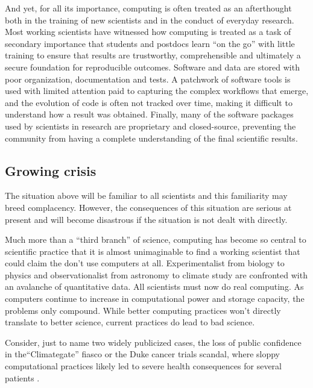 \documentclass[ChapterTOCs,krantz2]{krantz} %
\begin{document}
And yet, for all its importance, computing is often treated as an
afterthought both in the training of new scientists and in the conduct
of everyday research. Most working scientists have witnessed how computing
is treated as a task of secondary importance that students and postdocs
learn ``on the go'' with little training to ensure that results
are trustworthy, comprehensible and ultimately a secure foundation
for reproducible outcomes. Software and data are stored with poor
organization, documentation and tests. A patchwork of software tools
is used with limited attention paid to capturing the complex workflows
that emerge, and the evolution of code is often not tracked over time,
making it difficult to understand how a result was obtained. Finally,
many of the software packages used by scientists in research are proprietary
and closed-source, preventing the community from having a complete
understanding of the final scientific results.

\subsection{Growing crisis}

The situation above will be familiar to all scientists and this familiarity
may breed complacency. However, the consequences of this situation are serious
at present and will become disastrous if the situation is not dealt with
directly. 

Much more than a ``third branch'' of science, computing has become so central
to scientific practice that it is almost unimaginable to find a working
scientist that could claim the don't use computers at all.  Experimentalist
from biology to physics and observationalist from astronomy to climate study
are confronted with an avalanche of quantitative data.  All scientists must now
do real computing.  As computers continue to increase in computational power and
storage capacity, the problems only compound.  While better computing practices
won't directly translate to better science, current practices do lead to bad
science.

Consider, just to name two widely publicized cases, the loss of public
confidence in the``Climategate'' fiasco \cite{Hef10} or the Duke cancer trials
scandal, where sloppy computational practices likely led to severe health
consequences for several patients \cite{Cou10}. 
\end{document}
